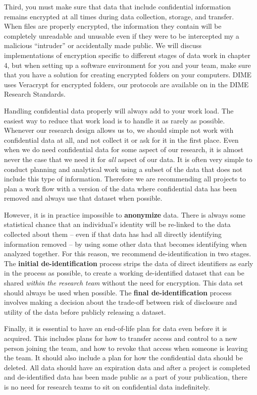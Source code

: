 Third, you must make sure that data that include confidential information
remains encrypted at all times during data collection, storage, and transfer.
When files are properly encrypted,
the information they contain will be completely unreadable and unusable
even if they were to be intercepted my a malicious
``intruder'' or accidentally made public.
We will discuss implementations of encryption
specific to different stages of data work in chapter 4,
but when setting up a software environment for you and your team,
make sure that you have a solution for creating encrypted folders on your computers.
DIME uses Veracrypt for encrypted folders,
our protocols are available on in the DIME Research Standards.

Handling confidential data properly will always add to your work load.
The easiest way to reduce that work load is to
handle it as rarely as possible.
Whenever our research design allows us to,
we should simple not work with confidential data at all,
and not collect it or ask for it in the first place.
Even when we do need confidential data for some aspect of our research,
it is almost never the case that we need it for \textit{all} aspect of our data.
It is often very simple to conduct planning and analytical work
using a subset of the data that does not include this type of information.
Therefore we are recommending all projects to plan a work flow
with a version of the data where confidential data has been removed
and always use that dataset when possible.

However, it is in practice impossible to \textbf{anonymize} data.
There is always some statistical chance that an individual's identity
will be re-linked to the data collected about them
-- even if that data has had all directly identifying information removed --
by using some other data that becomes identifying when analyzed together.
For this reason, we recommend de-identification in two stages.
The \textbf{initial de-identification} process strips the data of direct identifiers
as early in the process as possible,
to create a working de-identified dataset that
can be shared \textit{within the research team} without the need for encryption.
This data set should always be used when possible.
The \textbf{final de-identification} process involves
making a decision about the trade-off between
risk of disclosure and utility of the data
before publicly releasing a dataset.

Finally, it is essential to have an end-of-life plan for data even before it is acquired.
This includes plans for how to transfer access and control to a new person joining the team,
and how to revoke that access when someone is leaving the team.
It should also include a plan for how the confidential data should be deleted.
All data should have an expiration data and after a project is completed and
de-identified data has been made public as a part of your publication,
there is no need for research teams to sit on confidential data indefinitely.
